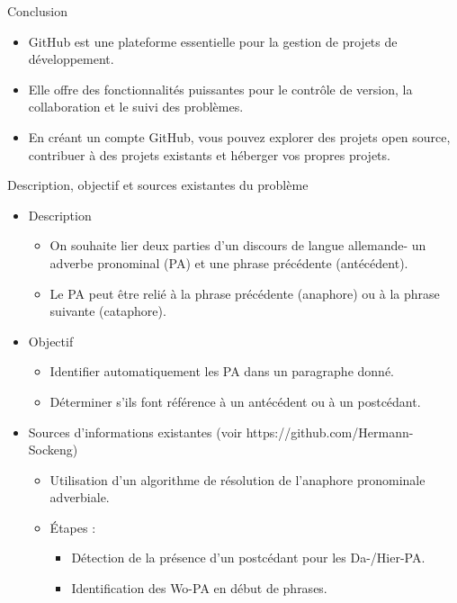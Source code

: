 \documentclass{beamer}
\begin{document}
\begin{frame}{Conclusion}
	\begin{itemize}
		\item GitHub est une plateforme essentielle pour la gestion de projets de développement.
		\item Elle offre des fonctionnalités puissantes pour le contrôle de version, la collaboration et le suivi des problèmes.
		\item En créant un compte GitHub, vous pouvez explorer des projets open source, contribuer à des projets existants et héberger vos propres projets.
	\end{itemize}
\end{frame}



\begin{frame}{Description, objectif et sources existantes du problème}
	\begin{itemize}
		\item Description
	
	\begin{itemize}
		\item On souhaite lier deux parties d'un discours de langue allemande- un adverbe pronominal (PA) et une phrase précédente (antécédent).
		\item Le PA peut être relié à la phrase précédente (anaphore) ou à la phrase suivante (cataphore).
	\end{itemize}


\item Objectif
	\begin{itemize}
		\item Identifier automatiquement les PA dans un paragraphe donné.
		\item Déterminer s'ils font référence à un antécédent ou à un postcédant.
	\end{itemize}

\item  Sources d'informations existantes (voir https://github.com/Hermann-Sockeng)
\begin{itemize}
    \item Utilisation d'un algorithme de résolution de l'anaphore pronominale adverbiale.
\item Étapes :
\begin{itemize}
	\item Détection de la présence d'un postcédant pour les Da-/Hier-PA.
	\item Identification des Wo-PA en début de phrases.
\end{itemize}
\end{itemize}
\end{itemize}
\end{frame}
\end{document}
